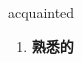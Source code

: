 
\begin{frame}
{\huge acquainted}
\begin{center}
\begin{enumerate}\Large
  \item \textbf{熟悉的}
\end{enumerate}
\end{center}
\end{frame}
